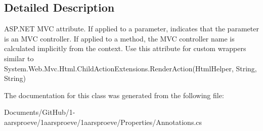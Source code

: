 \subsection{Detailed Description}
A\+S\+P.\+N\+E\+T M\+V\+C attribute. If applied to a parameter, indicates that the parameter is an M\+V\+C controller. If applied to a method, the M\+V\+C controller name is calculated implicitly from the context. Use this attribute for custom wrappers similar to {\ttfamily System.\+Web.\+Mvc.\+Html.\+Child\+Action\+Extensions.\+Render\+Action(\+Html\+Helper, String, String)} 



The documentation for this class was generated from the following file\+:\begin{DoxyCompactItemize}
\item 
Documents/\+Git\+Hub/1-\/aarsproeve/1aarsproeve/1aarsproeve/\+Properties/Annotations.\+cs\end{DoxyCompactItemize}

